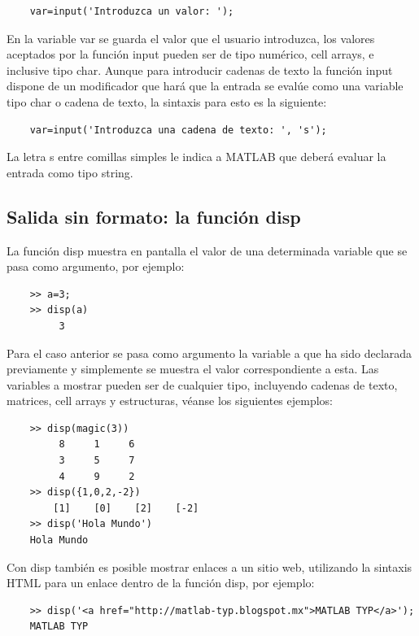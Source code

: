 \begin{verbatim}
	var=input('Introduzca un valor: ');
\end{verbatim}

En la variable var se guarda el valor que el usuario introduzca, los valores aceptados por 
la función input pueden ser de tipo numérico, cell arrays, e inclusive tipo char. Aunque 
para introducir cadenas de texto la función input dispone de un modificador que hará que 
la entrada se evalúe como una variable tipo char o cadena de texto, la sintaxis para 
esto es la siguiente:

\begin{verbatim}
	var=input('Introduzca una cadena de texto: ', 's');
\end{verbatim}

La letra s entre comillas simples le indica a MATLAB que deberá evaluar la entrada como tipo string.

\subsection{Salida sin formato: la función disp}

La función disp muestra en pantalla el valor de una determinada variable que se pasa como 
argumento, por ejemplo:

\begin{verbatim}
	>> a=3;
	>> disp(a)
	     3
\end{verbatim}

Para el caso anterior se pasa como argumento la variable a que ha sido declarada previamente 
y simplemente se muestra el valor correspondiente a esta. Las variables a mostrar pueden ser 
de cualquier tipo, incluyendo cadenas de texto, matrices, cell arrays y estructuras, 
véanse los siguientes ejemplos:

\begin{verbatim}
	>> disp(magic(3))
	     8     1     6
	     3     5     7
	     4     9     2
	>> disp({1,0,2,-2})
	    [1]    [0]    [2]    [-2]
	>> disp('Hola Mundo')
	Hola Mundo
\end{verbatim}

Con disp también es posible mostrar enlaces a un sitio web, utilizando la sintaxis HTML para 
un enlace dentro de la función disp, por ejemplo:

\begin{verbatim}
	>> disp('<a href="http://matlab-typ.blogspot.mx">MATLAB TYP</a>');
	MATLAB TYP
\end{verbatim}

